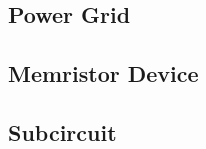 \clearpage
\subsection{Power Grid}


%

\clearpage
\subsection{Memristor Device}




\clearpage
\subsection{Subcircuit}
\label{SubcircuitInstance}




